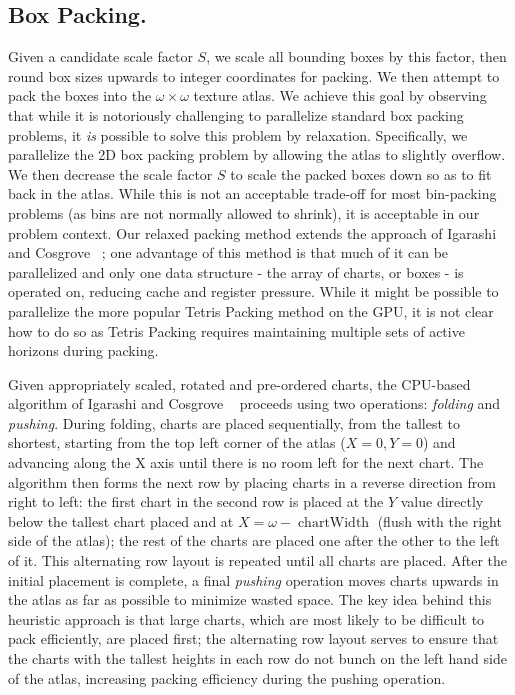 \subsection{Box Packing.}
\label{sec:actual_packing}
Given a candidate scale factor $S$, we scale all bounding boxes by this factor, then round box sizes upwards to integer coordinates for packing. We then attempt to pack the boxes into the $\omega \times \omega$ texture atlas. We achieve this goal by observing that while it is notoriously challenging to parallelize standard box packing problems, it {\em is} possible to solve this problem by relaxation. Specifically, we parallelize the 2D box packing problem by allowing the atlas to slightly overflow. We then decrease the scale factor $S$ to scale the packed boxes down so as to fit back in the atlas. While this is not an acceptable trade-off for most bin-packing problems (as bins are not normally allowed to shrink), it is acceptable in our problem context. Our relaxed packing method extends the approach of Igarashi and Cosgrove ~; one advantage of this method is that much of it can be parallelized and only one data structure - the array of charts, or boxes - is operated on, reducing cache and register pressure. While it might be possible to parallelize the more popular Tetris Packing method \cite{levy2002least} on the GPU, it is not clear how to do so as Tetris Packing requires maintaining multiple sets of active horizons during packing. 

Given appropriately scaled, rotated and pre-ordered charts, the CPU-based algorithm of Igarashi and Cosgrove ~ 
proceeds using two operations: {\em folding} and {\em pushing}. During folding, charts are placed sequentially, from the tallest to shortest, starting from the top left corner of the atlas ($X=0,Y=0$) and advancing along the X axis until there is no room left for the next chart. The algorithm then forms the next row by placing charts in a reverse direction from right to left: the first chart in the second row is placed at the $Y$ value directly below the tallest chart placed and at $X= \omega - \operatorname{chartWidth}$ (flush with the right side of the atlas); the rest of the charts are placed one after the other to the left of it. This alternating row layout is repeated until all charts are placed. After the initial placement is complete, a final {\em pushing} operation moves charts upwards in the atlas as far as possible to minimize wasted space. The key idea behind this heuristic approach is that large charts, which are most likely to be difficult to pack efficiently, are placed first; the alternating row layout serves to ensure that the charts with the tallest heights in each row do not bunch on the left hand side of the atlas, increasing packing efficiency during the pushing operation. 

